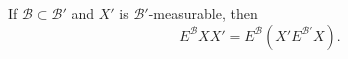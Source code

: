If $\mathcal{B} \subset \mathcal{B}'$ and $X'$ is $\mathcal{B}'$-measurable, then $$E^{\mathcal{B}}XX' = E^{\mathcal{B}}(X'E^{\mathcal{B}'}X).$$
